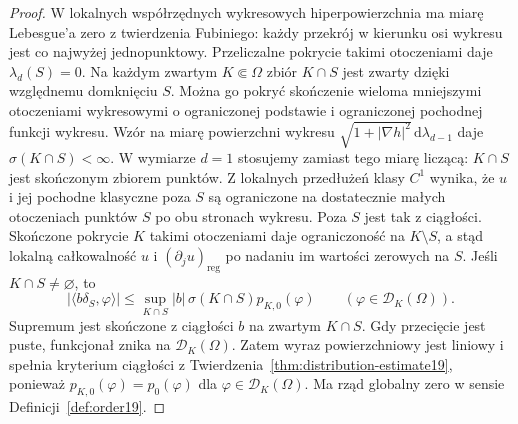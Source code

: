 \begin{proof}
W lokalnych współrzędnych wykresowych hiperpowierzchnia
ma miarę Lebesgue'a zero z twierdzenia Fubiniego:
każdy przekrój w kierunku osi wykresu jest co najwyżej
jednopunktowy. Przeliczalne pokrycie takimi otoczeniami
daje $\lambda_d(S)=0$. Na każdym zwartym $K\Subset\Omega$
zbiór $K\cap S$ jest zwarty dzięki względnemu domknięciu
$S$. Można go pokryć skończenie wieloma mniejszymi
otoczeniami wykresowymi o ograniczonej podstawie
i ograniczonej pochodnej funkcji wykresu.
Wzór na miarę powierzchni wykresu
$\sqrt{1+|\nabla h|^2}\,\mathrm d\lambda_{d-1}$
daje $\sigma(K\cap S)<\infty$.
W wymiarze $d=1$ stosujemy zamiast tego miarę
liczącą: $K\cap S$ jest skończonym zbiorem punktów.
Z lokalnych przedłużeń klasy $C^1$ wynika,
że $u$ i jej pochodne klasyczne poza $S$ są
ograniczone na dostatecznie małych otoczeniach
punktów $S$ po obu stronach wykresu. Poza $S$
jest tak z ciągłości. Skończone pokrycie $K$
takimi otoczeniami daje ograniczoność na $K\setminus S$,
a stąd lokalną całkowalność $u$
i $(\partial_ju)_{\mathrm{reg}}$ po nadaniu im
wartości zerowych na $S$.
Jeśli $K\cap S\ne\varnothing$, to
\[
 |\langle b\delta_S,\varphi\rangle|
 \le \sup_{K\cap S}|b|\,\sigma(K\cap S)p_{K,0}(\varphi)
 \qquad(\varphi\in\mathcal D_K(\Omega)).
\]
Supremum jest skończone z ciągłości $b$ na
zwartym $K\cap S$. Gdy przecięcie jest puste,
funkcjonał znika na $\mathcal D_K(\Omega)$. Zatem wyraz powierzchniowy
jest liniowy i spełnia kryterium ciągłości
z Twierdzenia~\ref{thm:distribution-estimate19},
ponieważ $p_{K,0}(\varphi)=p_0(\varphi)$ dla
$\varphi\in\mathcal D_K(\Omega)$.
Ma rząd globalny zero w sensie Definicji~\ref{def:order19}.


\end{proof}
